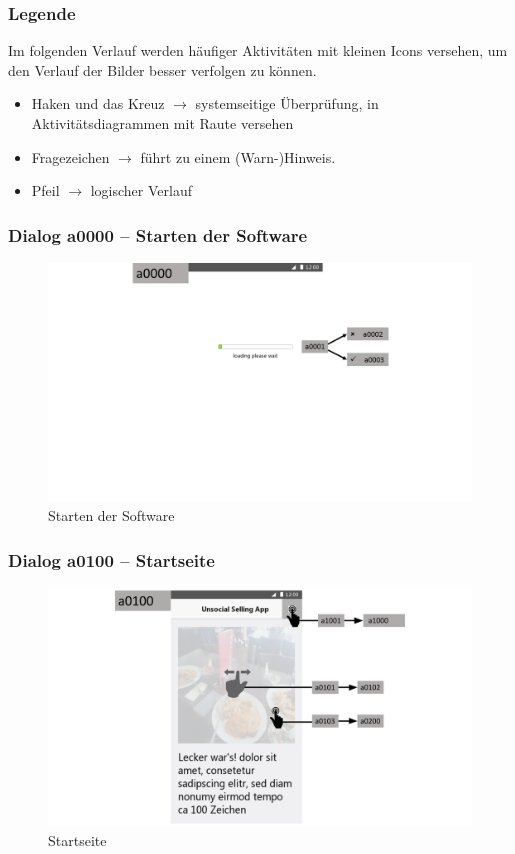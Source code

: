 \documentclass[a4paper,12pt,oneside]{scrartcl}
\begin{document}
\subsubsection*{Legende}
Im folgenden Verlauf werden häufiger Aktivitäten mit kleinen Icons versehen, um den Verlauf der Bilder besser verfolgen zu können.
\begin{itemize}
	\item Haken und das Kreuz $\rightarrow$  systemseitige Überprüfung, in Aktivitätsdiagrammen mit Raute versehen
	\item Fragezeichen $\rightarrow$ führt zu einem (Warn-)Hinweis.
	\item Pfeil $\rightarrow$ logischer Verlauf
\end{itemize}

\subsubsection{Dialog a0000 – Starten der Software}
\begin{figure}[!htbp]
\centering
\noindent\includegraphics[width=\linewidth,height=\textheight,keepaspectratio]{Dialoge/a0000}
\caption{Starten der Software}
\end{figure}
\FloatBarrier

\subsubsection{Dialog a0100 – Startseite}
\begin{figure}[!htbp]
\centering
\noindent\includegraphics[width=\linewidth,height=\textheight,keepaspectratio]{Dialoge/a0100}
\caption{Startseite}
\end{figure}
\FloatBarrier
\end{document}
